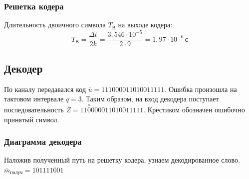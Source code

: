 \documentclass[a4paper, 12pt]{article}
\begin{document}
\subsubsection{Решетка кодера}



Длительность двоичного символа \(T_В\) на выходе кодера:
\[T_В=\frac{\Delta t}{2k}=\frac{3,546\cdot 10^{-5}}{2\cdot 9}=
1,97\cdot 10^{-6}\,с\]

\subsection{Декодер}
По каналу передавался код \(\overline{u}=11 10 00 01 10 10 01 11 11\).
Ошибка произошла на тактовом интервале \(q=3\).
Таким образом, на вход декодера поступает последовательность 
\(\overline{Z}=11 \overset{\times}{0} 0 00 01 10 10 01 11 11\). Крестиком обозначен ошибочно принятый символ.

\subsubsection{Диаграмма декодера}


Наложив полученный путь на решетку кодера, узнаем декодированное слово.
$\overline{m}_{получ}=101111001$
\end{document}
